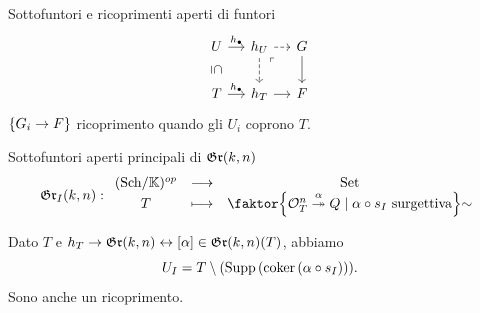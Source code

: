 \documentclass[a4paper]{beamer}
\begin{document}










\begin{frame}{Sottofuntori e ricoprimenti aperti di funtori}
\[\begin{tikzcd}[ampersand replacement=\&, column sep=small]
	U \& {h_{U}} \& G \\
	T \& {h_T} \& F
	\arrow["\yo", from=1-1, to=1-2]
	\arrow["\subseteq"{marking, allow upside down}, draw=none, from=1-1, to=2-1]
	\arrow[dashed, from=1-2, to=1-3]
	\arrow[dashed, from=1-2, to=2-2]
	\arrow["\ulcorner"{anchor=center, pos=0.125}, draw=none, from=1-2, to=2-3]
	\arrow[from=1-3, to=2-3]
	\arrow["\yo", from=2-1, to=2-2]
	\arrow[from=2-2, to=2-3]
\end{tikzcd}\]
$\left\{{G_i\to F}\right\}$ ricoprimento quando gli $U_i$ coprono $T$.
\pause
\begin{block}{Sottofuntori aperti principali di $\mathfrak{Gr}(k,n)$}
\[\gr_I(k,n):\funcDef{(\Sch\K)\op}{\Set}{T}{\quot{\cpa{\Oc_T^n\overset{\al}\onto Q\mid \al\circ s_I\text{ surgettiva}}}\sim}\]
\end{block}
Dato $T$ e $h_T\to \mathfrak{Gr}(k,n)\leftrightarrow [\alpha]\in \mathfrak{Gr}(k,n)(T)$, abbiamo \[U_I=T\setminus (\mathrm{Supp}\, (\mathrm{coker}\,(\alpha\circ s_I))).\]
Sono anche un ricoprimento.
\end{frame}
\end{document}
